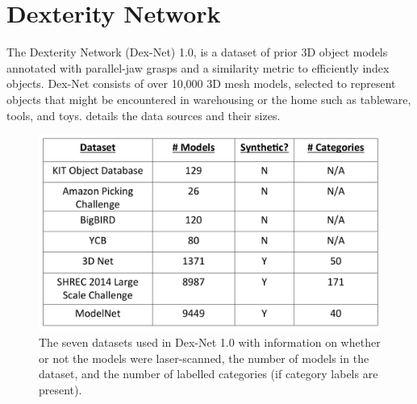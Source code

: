 \section{Dexterity Network}

The Dexterity Network (Dex-Net) 1.0, is a dataset of prior 3D object models annotated with parallel-jaw grasps and a similarity metric to efficiently index objects.
Dex-Net consists of over 10,000 3D mesh models, selected to represent objects that might be encountered in warehousing or the home such as tableware, tools, and toys.
 details the data sources and their sizes.

\begin{figure}[t!]
\centering
\includegraphics[scale=0.1]{figures/dataset_table.jpg}
\caption{The seven datasets used in Dex-Net 1.0 with information on whether or not the models were laser-scanned, the number of models in the dataset, and the number of labelled categories (if category labels are present).}
\vspace*{-15pt}
\end{figure}


